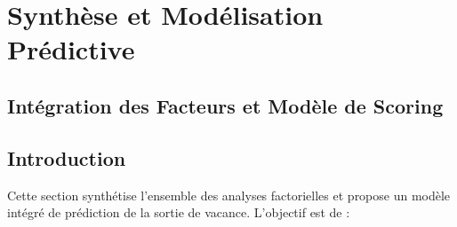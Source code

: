 \documentclass[11pt]{article}
\makeatletter
\newcommand{\boxspacing}{\kern\kvtcb@left@rule\kern\kvtcb@boxsep}
\newcommand{\prompt}[4]{
        {\ttfamily\llap{{\color{#2}[#3]:\hspace{3pt}#4}}\vspace{-\baselineskip}}
    }
\makeatother
\begin{document}
    

    \begin{tcolorbox}[breakable, size=fbox, boxrule=1pt, pad at break*=1mm,colback=cellbackground, colframe=cellborder]
\prompt{In}{incolor}{ }{\boxspacing}
\begin{Verbatim}[commandchars=\\\{\}]

\end{Verbatim}
\end{tcolorbox}

    \begin{tcolorbox}[breakable, size=fbox, boxrule=1pt, pad at break*=1mm,colback=cellbackground, colframe=cellborder]
\prompt{In}{incolor}{ }{\boxspacing}
\begin{Verbatim}[commandchars=\\\{\}]

\end{Verbatim}
\end{tcolorbox}

    \begin{tcolorbox}[breakable, size=fbox, boxrule=1pt, pad at break*=1mm,colback=cellbackground, colframe=cellborder]
\prompt{In}{incolor}{ }{\boxspacing}
\begin{Verbatim}[commandchars=\\\{\}]

\end{Verbatim}
\end{tcolorbox}

    \section{Synthèse et Modélisation
Prédictive}\label{synthuxe8se-et-moduxe9lisation-pruxe9dictive}

\subsection{Intégration des Facteurs et Modèle de
Scoring}\label{intuxe9gration-des-facteurs-et-moduxe8le-de-scoring}

\subsection{Introduction}\label{introduction}

Cette section synthétise l'ensemble des analyses factorielles et propose
un modèle intégré de prédiction de la sortie de vacance. L'objectif est
de :
\end{document}
